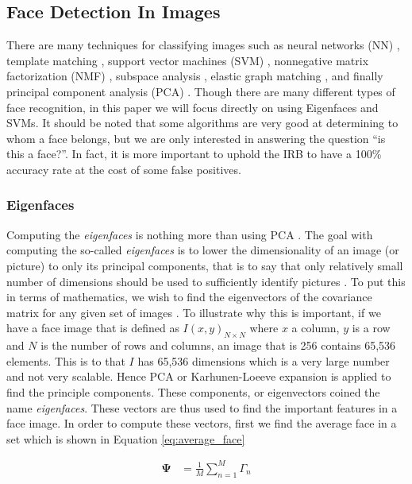 \documentclass[
	submission,
	final,
	notitlepage,
	narroweqnarray,
	inline,
	twoside,
	]{ieee}
\begin{document}
\subsection{Face Detection In Images}
There are many techniques for classifying images such as neural
networks (NN) \cite{face_neural_net}, template matching \cite{face_template}, support vector machines (SVM) \cite{face_svm}, 
nonnegative matrix factorization (NMF) \cite{face_mat_fact}, subspace analysis \cite{face_subspace_analysis}, 
elastic graph matching \cite{face_elastic_bunch}, and finally principal component analysis (PCA) \cite{face_kpca}. 
Though there are many different types of face recognition, in this paper we 
will focus directly on using Eigenfaces and SVMs. It should be noted 
that some algorithms are very good at determining to whom a face
belongs, but we are only interested in answering the question  
``is this a face?''. In fact, it is more important to uphold the IRB
to have a 100\% accuracy rate at the cost of some false positives.

\subsubsection{Eigenfaces}
Computing the \textit{eigenfaces} is nothing more than using PCA \cite{eigen_faces}. 
The goal with computing the so-called \textit{eigenfaces} is to lower the dimensionality
of an image (or picture) to only its principal components, that is to say
that only relatively small number of dimensions should be used
to sufficiently identify pictures \cite{eigen_faces}. To put this in 
terms of mathematics, we wish to find the eigenvectors of the covariance
matrix for any given set of images \cite{eigen_face_recognition}. To 
illustrate why this is important, if we have a face image that is defined 
as $I(x,y)_{N \times N}$ where $x$ a column, $y$ is a row and $N$ is the
number of rows and columns, an image that is 256 contains 65,536 elements.
This is to that $I$ has 65,536 dimensions which is a very large number
and not very scalable. Hence PCA or Karhunen-Loeeve expansion is 
applied to find the principle components. These components, or 
eigenvectors coined the name \textit{eigenfaces}. These vectors are thus
used to find the important features in a face image. In order to compute
these vectors, first we
find the average face in a set which is shown in Equation \ref{eq:average_face}

\begin{align}
  \mathbf{\Psi} &= \frac{1}{M} \sum_{n=1}^{M}\Gamma_n \label{eq:average_face}
\end{align}
\end{document}
